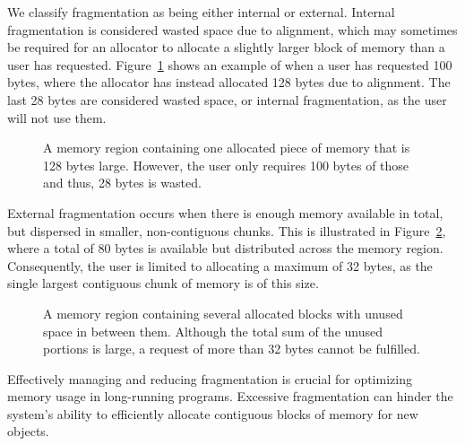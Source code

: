 
We classify fragmentation as being either internal or external. Internal fragmentation is considered wasted space due to alignment, which may sometimes be required for an allocator to allocate a slightly larger block of memory than a user has requested. Figure~\ref{fig:internal_fragmentation} shows an example of when a user has requested 100 bytes, where the allocator has instead allocated 128 bytes due to alignment. The last 28 bytes are considered wasted space, or internal fragmentation, as the user will not use them.

\begin{figure}[H]
    \centering
    \vspace*{0.2cm}
    
    \vspace*{0.2cm}
    \caption{A memory region containing one allocated piece of memory that is 128 bytes large. However, the user only requires 100 bytes of those and thus, 28 bytes is wasted.}
    \label{fig:internal_fragmentation}
\end{figure}

External fragmentation occurs when there is enough memory available in total, but dispersed in smaller, non-contiguous chunks. This is illustrated in Figure~\ref{fig:external_fragmentation}, where a total of 80 bytes is available but distributed across the memory region. Consequently, the user is limited to allocating a maximum of 32 bytes, as the single largest contiguous chunk of memory is of this size.

\begin{figure}[H]
    \centering
    \vspace*{0.2cm}
    \hspace*{1.2cm}
    
    \vspace*{0.2cm}
    \caption{A memory region containing several allocated blocks with unused space in between them. Although the total sum of the unused portions is large, a request of more than 32 bytes cannot be fulfilled.}
    \label{fig:external_fragmentation}
\end{figure}

Effectively managing and reducing fragmentation is crucial for optimizing memory usage in long-running programs. Excessive fragmentation can hinder the system's ability to efficiently allocate contiguous blocks of memory for new objects.

